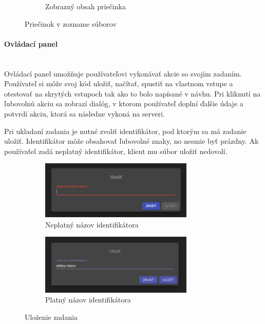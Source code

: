 \begin{figure}[H]
\begin{subfigure}{.5\textwidth}
  \caption[Zobrazný obsah priečinka]{Zobrazný obsah priečinka}
  \label{obr:zobrazeny_zoznam}
\end{subfigure}
\caption{Priečinok v zozname súborov}
\end{figure}

\paragraph{Ovládací panel}\leavevmode\\
Ovládací panel umožňuje používateľovi vykonávať akcie so svojím zadaním. Používateľ si môže svoj kód
uložiť, načítať, spustiť na vlastnom vstupe a otestovať na skrytých vstupoch tak ako to bolo 
napísané v návhu. Pri kliknutí na ľubovolnú akciu sa zobrazí dialóg, v ktorom používateľ doplní
ďalšie údaje a potvrdí akciu, ktorá sa následne vykoná na serveri.

Pri ukladaní zadania je nutné zvoliť identifikátor, pod ktorým sa má zadanie uložiť. Identifikátor
môže obsahovať ľubovolné znaky, no nesmie byť prázdny. Ak používaťel zadá neplatný 
identifikátor, klient mu súbor uložiť nedovolí.
\begin{figure}[H]
\centering
\begin{subfigure}{.5\textwidth}
  \centering
  \includegraphics[width=0.8\textwidth]{images/neplatny_nazov}
  \caption[Neplatný názov identifikátora]{Neplatný názov identifikátora}
  \label{obr:neplatny_nazov}
\end{subfigure}%
\begin{subfigure}{.5\textwidth}
  \centering
  \includegraphics[width=0.8\textwidth]{images/platny_nazov}
  \caption[Platný názov identifikátora]{Platný názov identifikátora}
  \label{obr:platny_nazov}
\end{subfigure}
\caption{Uloženie zadania}
\end{figure}

